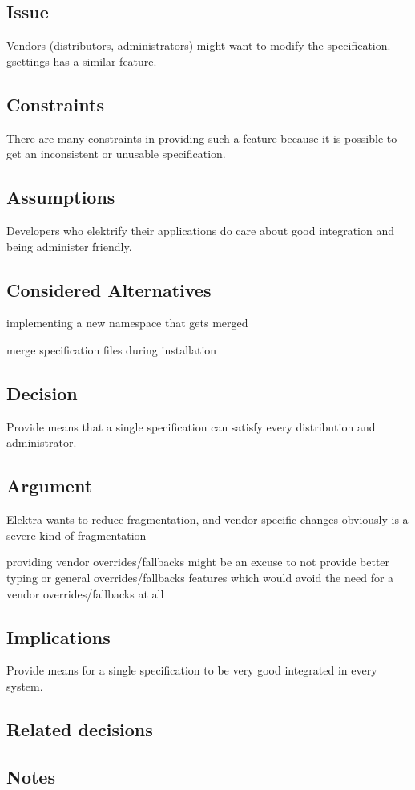 \subsection*{Issue}

Vendors (distributors, administrators) might want to modify the specification. gsettings has a similar feature.

\subsection*{Constraints}

There are many constraints in providing such a feature because it is possible to get an inconsistent or unusable specification.

\subsection*{Assumptions}

Developers who elektrify their applications do care about good integration and being administer friendly.

\subsection*{Considered Alternatives}


\begin{DoxyItemize}
\item implementing a new namespace that gets merged
\item merge specification files during installation
\end{DoxyItemize}

\subsection*{Decision}

Provide means that a single specification can satisfy every distribution and administrator.

\subsection*{Argument}


\begin{DoxyItemize}
\item Elektra wants to reduce fragmentation, and vendor specific changes obviously is a severe kind of fragmentation
\item providing vendor overrides/fallbacks might be an excuse to not provide better typing or general overrides/fallbacks features which would avoid the need for a vendor overrides/fallbacks at all
\end{DoxyItemize}

\subsection*{Implications}

Provide means for a single specification to be very good integrated in every system.

\subsection*{Related decisions}

\subsection*{Notes}